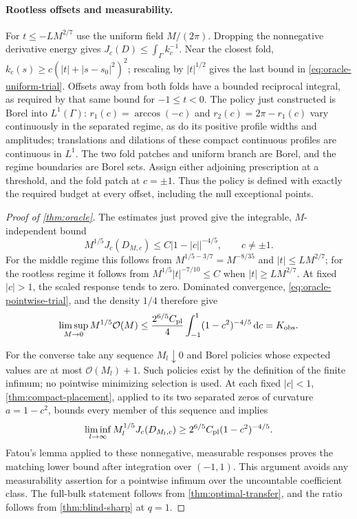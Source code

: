 \paragraph{Rootless offsets and measurability.}
For $t\le-LM^{2/7}$ use the uniform field $M/(2\pi)$.
Dropping the nonnegative derivative energy gives
$J_c(D)\le\int_\Gamma k_c^{-1}$.
Near the closest fold, $k_c(s)\ge c(|t|+|s-s_0|^2)^2$;
rescaling by $|t|^{1/2}$ gives the last bound in
\eqref{eq:oracle-uniform-trial}. Offsets away from both folds have a
bounded reciprocal integral, as required by that same bound for
$-1\le t<0$.
The policy just constructed is Borel into $L^1(\Gamma)$:
$r_1(c)=\arccos(-c)$ and $r_2(c)=2\pi-r_1(c)$ vary continuously in
the separated regime, as do its positive profile widths and
amplitudes; translations and dilations of these compact continuous
profiles are continuous in $L^1$. The two fold patches and uniform
branch are Borel, and the regime boundaries are Borel sets. Assign
either adjoining prescription at a threshold, and the fold patch at
$c=\pm1$. Thus the policy is defined with exactly the required budget
at every offset, including the null exceptional points.

\begin{proof}[Proof of \cref{thm:oracle}]
The estimates just proved give the integrable, $M$-independent bound
\begin{equation}\label{eq:oracle-domination}
 M^{1/5}J_c(D_{M,c})\le C|1-|c||^{-4/5},\qquad c\ne\pm1.
\end{equation}
For the middle regime this follows from
$M^{1/5-3/7}=M^{-8/35}$ and $|t|\le LM^{2/7}$; for the rootless
regime it follows from $M^{1/5}|t|^{-7/10}\le C$ when
$|t|\ge LM^{2/7}$.
At fixed $|c|>1$, the scaled response tends to zero. Dominated
convergence, \eqref{eq:oracle-pointwise-trial}, and the density $1/4$
therefore give
\[
 \limsup_{M\to0}M^{1/5}\mathcal O(M)
 \le\frac{2^{6/5}C_{\rm pl}}4
       \int_{-1}^1(1-c^2)^{-4/5}\,\mathrm d c=K_{\rm obs}.
\]

For the converse take any sequence $M_l\downarrow0$ and Borel
policies whose expected values are at most $\mathcal O(M_l)+1$.
Such policies exist by the definition of the finite infimum; no
pointwise minimizing selection is used.
At each fixed $|c|<1$, \cref{thm:compact-placement}, applied to its
two separated zeros of curvature $a=1-c^2$, bounds every member of
this sequence and implies
\[
 \liminf_{l\to\infty}M_l^{1/5}J_c(D_{M_l,c})
 \ge 2^{6/5}C_{\rm pl}(1-c^2)^{-4/5}.
\]
Fatou's lemma applied to these nonnegative, measurable responses
proves the matching lower bound after integration over $(-1,1)$.
This argument avoids any measurability assertion for a pointwise
infimum over the uncountable coefficient class.
The full-bulk statement follows from \cref{thm:optimal-transfer},
and the ratio follows from \cref{thm:blind-sharp} at $q=1$.
\end{proof}

